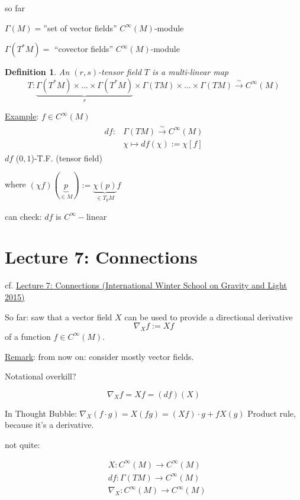 \documentclass[10pt]{amsart}
\newtheorem{definition}{Definition}
\begin{document}
\begin{multicols*}{2}
	so far
	
	$\Gamma(M) = $''set of vector fields''  $C^{\infty}(M)$-module
	
	$\Gamma(T^*M) = $ ``covector fields'' $C^{\infty}(M)$-module
	
	\begin{definition}
		An $(r,s)$-tensor field $T$ is a multi-linear map
		\[
		T:\underbrace{ \Gamma(T^*M) \times \dots \times \Gamma(T^*M) }_{r} \times \Gamma(TM) \times \dots \times \Gamma(TM) \xrightarrow{ \sim } C^{\infty}(M)
		\]
	\end{definition}
	
	\underline{Example}: $f\in C^{\infty}(M)$ 
	\[
	\begin{gathered}
	\begin{aligned} 
	df : & \Gamma(TM) \xrightarrow{ \sim } C^{\infty}(M) \\ 
	& \chi \mapsto df(\chi) := \chi [f]
	\end{aligned}
	\end{gathered}
	\]
	$df$ ($0,1$)-T.F. (tensor field)
	
	where $(\chi f)(\underbrace{p}_{ \in M}) := \underbrace{ \chi(p) }_{ \in T_pM}f$
	
	can check: $df$ is $C^{\infty}-$linear
	
	
	\section*{Lecture 7: Connections}

cf. \href{https://youtu.be/nEaiZBbCVtI}{Lecture 7: Connections (International Winter School on Gravity and Light 2015)}
	
So far: saw that a vector field $X$ can be used to provide a directional derivative \\
\[
\nabla_X f :=  Xf
\] 
of a function $f \in C^{\infty}(M)$.
	
\underline{Remark}: from now on: consider mostly vector fields.

Notational overkill?

\[
\nabla_X f = Xf = (df)(X)
\]

In Thought Bubble: $\nabla_X(f \cdot g) = X(fg) = (Xf) \cdot g + fX(g)$ Product rule, because it's a derivative.

not quite:
	
	\[
	\begin{aligned}
	& X : C^{\infty}(M) \to C^{\infty}(M) \\ 
	& df : \Gamma(TM) \to C^{\infty}(M) \\
	& \nabla_X : C^{\infty}(M) \to C^{\infty}(M)
	\end{aligned}
	\]
	

\end{multicols*}
\end{document}
